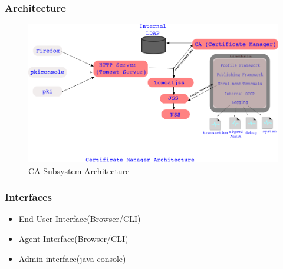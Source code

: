 \documentclass[a4paper]{article}
\begin{document}
\subsubsection{Architecture}
     \begin{figure}[ht!]
          \centering
          \includegraphics[width=120mm]{CA-subsystem-Arch3.png}
          \caption{CA Subsystem Architecture}
    \end{figure}
\subsubsection{Interfaces}
    \begin{itemize}
        \item End User Interface(Browser/CLI)
        \item Agent Interface(Browser/CLI)
        \item Admin interface(java console)
    \end{itemize}
\end{document}
